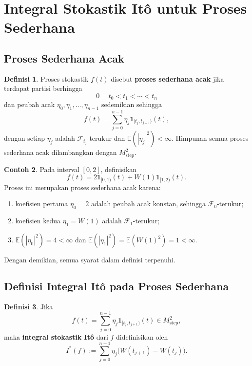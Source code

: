 \documentclass[12pt,a4paper]{article}
\theoremstyle{definition}
\newtheorem{definisi}{Definisi}[section]
\newtheorem{contoh}[definisi]{Contoh}
\theoremstyle{plain}
\newcommand{\E}{\mathbb{E}}
\newcommand{\F}{\mathcal{F}}
\newcommand{\ind}{\mathbf{1}}
\begin{document}
\section{Integral Stokastik It\^o untuk Proses Sederhana}

\subsection{Proses Sederhana Acak}

\begin{definisi}
  Proses stokastik $f(t)$ disebut \textbf{proses sederhana acak} jika terdapat
  partisi berhingga
  \[
    0=t_0<t_1<\cdots<t_n
  \]
  dan peubah acak $\eta_0,\eta_1,\ldots,\eta_{n-1}$ sedemikian sehingga
  \[
    f(t)=\sum_{j=0}^{n-1}\eta_j\ind_{[t_j,t_{j+1})}(t),
  \]
  dengan setiap $\eta_j$ adalah $\F_{t_j}$-terukur dan
  $\E(|\eta_j|^2)<\infty$. Himpunan semua proses sederhana acak dilambangkan
  dengan $M_{\mathrm{step}}^2$.
\end{definisi}

\begin{contoh}
  Pada interval $[0,2]$, definisikan
  \[
    f(t)=2\ind_{[0,1)}(t)+W(1)\ind_{[1,2)}(t).
  \]
  Proses ini merupakan proses sederhana acak karena:
  \begin{enumerate}[label=\alph*.]
    \item koefisien pertama $\eta_0=2$ adalah peubah acak konstan, sehingga
          $\F_0$-terukur;
    \item koefisien kedua $\eta_1=W(1)$ adalah $\F_1$-terukur;
    \item $\E(|\eta_0|^2)=4<\infty$ dan $\E(|\eta_1|^2)=\E(W(1)^2)=1<\infty$.
  \end{enumerate}
  Dengan demikian, semua syarat dalam definisi terpenuhi.
\end{contoh}

\subsection{Definisi Integral It\^o pada Proses Sederhana}

\begin{definisi}
  Jika
  \[
    f(t)=\sum_{j=0}^{n-1}\eta_j\ind_{[t_j,t_{j+1})}(t)
    \in M_{\mathrm{step}}^2,
  \]
  maka \textbf{integral stokastik It\^o} dari $f$ didefinisikan oleh
  \[
    I^\ast(f)
    :=
    \sum_{j=0}^{n-1}\eta_j\bigl(W(t_{j+1})-W(t_j)\bigr).
  \]
\end{definisi}
\end{document}
